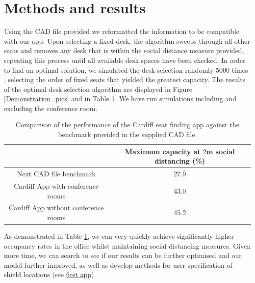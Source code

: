 \documentclass[11pt,a4paper]{article}
\begin{document}
\section*{Methods and results}
Using the CAD file provided we reformatted the information to be compatible with our app. Upon selecting a fixed desk, the algorithm sweeps through all other seats and removes any desk that is within the social distance measure provided, repeating this process until all available desk spaces have been checked. In order to find an optimal solution, we simulated the desk selection randomly $5000$ times , selecting the order of fixed seats that yielded the greatest capacity. The results of the optimal desk selection algorithm are displayed in Figure \ref{Demonstration_pics} and in Table \ref{tab:performance}.  We have run simulations including and excluding the conference room.







\begin{table}[ht!]
\begin{center}
 \begin{tabular}{|c |c|} 
 \hline
& \textbf{Maximum capacity at $2$m social distancing (\%)}\\ 
 \hline
 Next CAD file benchmark &   27.9\\ 
 \hline
 Cardiff App  with conference rooms& 43.0\\
\hline
Cardiff App without conference rooms & 45.2\\
 \hline
\end{tabular}
\end{center}
\caption{Comparison of the performance of the Cardiff seat finding app against the benchmark provided in the supplied CAD file.}
\label{tab:performance}
\end{table}


As demonstrated in Table \ref{tab:performance}, we can very quickly achieve significantly higher occupancy rates in the office whilst maintaining social distancing measures. Given more time, we can search to see if our results can be further optimised and our model further improved, as well as develop methods for user specification of shield locations (see \href{https://lucyhenley.shinyapps.io/CardiffMATHBIO_NERCHackathonTwo_PublicTransport/}{first app}).
\end{document}
